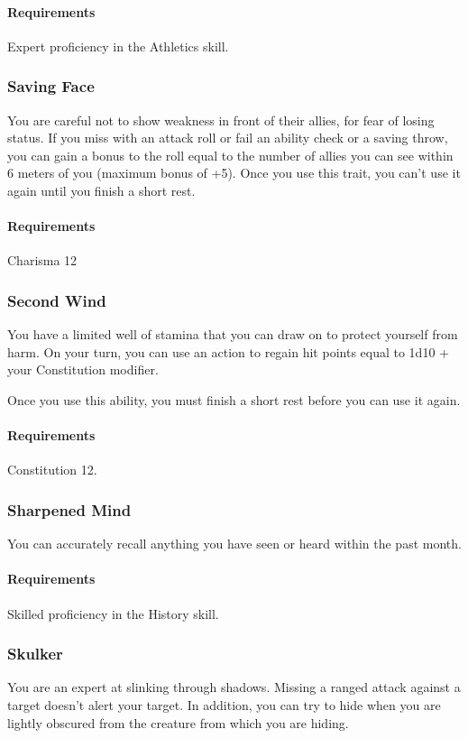     \paragraph{Requirements} Expert proficiency in the Athletics skill.
\subsubsection{Saving Face} \label{feat::savingface}
    You are careful not to show weakness in front of their allies, for fear of losing status.
    If you miss with an attack roll or fail an ability check or a saving throw, you can gain a bonus to the roll equal to the number of allies you can see within 6 meters of you (maximum bonus of +5).
    Once you use this trait, you can't use it again until you finish a short rest.
    \paragraph{Requirements} Charisma 12
\subsubsection{Second Wind} \label{feat::secondwind}
    You have a limited well of stamina that you can draw on to protect yourself from harm.
    On your turn, you can use an action to regain hit points equal to 1d10 + your Constitution modifier.

    Once you use this ability, you must finish a short rest before you can use it again.
    \paragraph{Requirements} Constitution 12.
\subsubsection{Sharpened Mind} \label{feat::sharpenedmind}
    You can accurately recall anything you have seen or heard within the past month.
    \paragraph{Requirements} Skilled proficiency in the History skill.
\subsubsection{Skulker} \label{feat::skulker}
    You are an expert at slinking through shadows.
    Missing a ranged attack against a target doesn't alert your target.
    In addition, you can try to hide when you are lightly obscured from the creature from which you are hiding.
